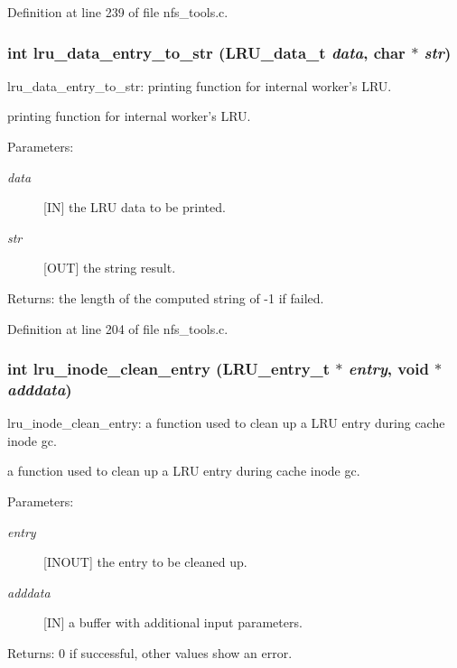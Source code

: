 Definition at line 239 of file nfs\_\-tools.c.
\subsubsection{\setlength{\rightskip}{0pt plus 5cm}int lru\_\-data\_\-entry\_\-to\_\-str (LRU\_\-data\_\-t {\em data}, char $\ast$ {\em str})}\label{nfs__tools_8c_a7}


lru\_\-data\_\-entry\_\-to\_\-str: printing function for internal worker's LRU.

printing function for internal worker's LRU.

\begin{Desc}
\item[Parameters:]
\begin{description}
\item[{\em data}][IN] the LRU data to be printed. \item[{\em str}][OUT] the string result.\end{description}
\end{Desc}
\begin{Desc}
\item[Returns:]the length of the computed string of -1 if failed. \end{Desc}


Definition at line 204 of file nfs\_\-tools.c.
\subsubsection{\setlength{\rightskip}{0pt plus 5cm}int lru\_\-inode\_\-clean\_\-entry (LRU\_\-entry\_\-t $\ast$ {\em entry}, void $\ast$ {\em adddata})}\label{nfs__tools_8c_a8}


lru\_\-inode\_\-clean\_\-entry: a function used to clean up a LRU entry during cache inode gc.

a function used to clean up a LRU entry during cache inode gc.

\begin{Desc}
\item[Parameters:]
\begin{description}
\item[{\em entry}][INOUT] the entry to be cleaned up. \item[{\em adddata}][IN] a buffer with additional input parameters.\end{description}
\end{Desc}
\begin{Desc}
\item[Returns:]0 if successful, other values show an error. \end{Desc}


